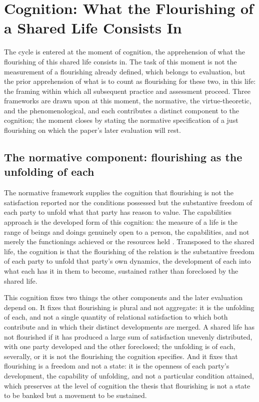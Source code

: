 \section{Cognition: What the Flourishing of a Shared Life Consists In}
\label{p11:sec:cognition}

\noindent
The cycle is entered at the moment of cognition, the apprehension of what the flourishing of this shared life consists in. The task of this moment is not the measurement of a flourishing already defined, which belongs to evaluation, but the prior apprehension of what is to count as flourishing for these two, in this life: the framing within which all subsequent practice and assessment proceed. Three frameworks are drawn upon at this moment, the normative, the virtue-theoretic, and the phenomenological, and each contributes a distinct component to the cognition; the moment closes by stating the normative specification of a just flourishing on which the paper's later evaluation will rest.

\subsection{The normative component: flourishing as the unfolding of each}
\label{p11:sec:cog-normative}

The normative framework supplies the cognition that flourishing is not the satisfaction reported nor the conditions possessed but the substantive freedom of each party to unfold what that party has reason to value. The capabilities approach is the developed form of this cognition: the measure of a life is the range of beings and doings genuinely open to a person, the capabilities, and not merely the functionings achieved or the resources held \parencite{sen1999,nussbaum2011}. Transposed to the shared life, the cognition is that the flourishing of the relation is the substantive freedom of each party to unfold that party's own dynamics, the development of each into what each has it in them to become, sustained rather than foreclosed by the shared life.

This cognition fixes two things the other components and the later evaluation depend on. It fixes that flourishing is plural and not aggregate: it is the unfolding of each, and not a single quantity of relational satisfaction to which both contribute and in which their distinct developments are merged. A shared life has not flourished if it has produced a large sum of satisfaction unevenly distributed, with one party developed and the other foreclosed; the unfolding is of each, severally, or it is not the flourishing the cognition specifies. And it fixes that flourishing is a freedom and not a state: it is the openness of each party's development, the capability of unfolding, and not a particular condition attained, which preserves at the level of cognition the thesis that flourishing is not a state to be banked but a movement to be sustained.

